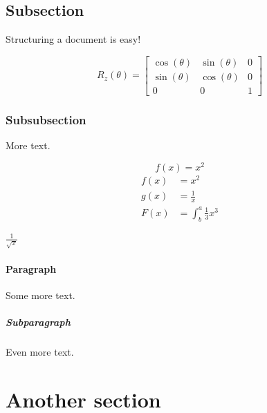 \documentclass{article}
\begin{document}
\subsection{Subsection}
































Structuring a document is easy!

\[    %
R_z (\theta)=
\begin{bmatrix}
    \cos(\theta) & \sin(\theta)  & 0 \\
    \sin(\theta) &  \cos(\theta)  & 0 \\
    0            & 0             & 1
\end{bmatrix}
\]    %

\subsubsection{Subsubsection}

More text.

\begin{equation*}
  f(x) = x^2
\end{equation*}
\begin{align*}
  f(x) &= x^2\\
  g(x) &= \frac{1}{x}\\
  F(x) &= \int^a_b \frac{1}{3}x^3
\end{align*}

\(\frac{1}{\sqrt{x}}\)

\paragraph{Paragraph}

Some more text.

\subparagraph{Subparagraph}

Even more text.

\section{Another section}
\end{document}
